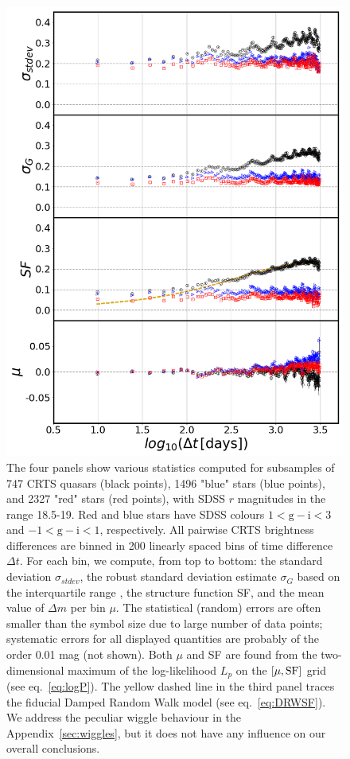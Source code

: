 \documentclass[fleqn,usenatbib]{mnras}
\begin{document}
\begin{figure}
\includegraphics[width=1.05\columnwidth, center]{Fig_2.png}
\vskip -0.15in
\caption{The four panels show various statistics computed for subsamples of 747 CRTS quasars (black points), 
1496 "blue" stars (blue points), and 2327 "red" stars (red points), with SDSS $r$ magnitudes in the range 18.5-19.
 Red and blue stars have SDSS colours $1 < \mathrm{g-i} < 3$ and  $-1 < \mathrm{g-i} < 1$, respectively. All pairwise CRTS brightness 
differences are binned in 200 linearly spaced bins of time difference $\Delta t$. For each bin, we compute,
from top to bottom: the standard deviation $\sigma_{stdev}$, the robust standard deviation estimate $\sigma_{G}$ based on 
the interquartile range , the structure function SF, and the mean value of $\Delta m$ per bin $\mu$. The statistical
(random) errors are often smaller than the symbol size due to large number of data points; systematic errors for
all displayed quantities are probably of the order 0.01 mag (not shown). Both $\mu$ and SF are found from the 
two-dimensional maximum of the log-likelihood $L_{p}$ on the $[\mu,\rm{SF}]$ grid (see eq.~\ref{eq:logP}).  
The yellow dashed line in the third panel traces the fiducial Damped Random Walk model (see eq.~\ref{eq:DRWSF}). We address the peculiar wiggle behaviour in the Appendix~\ref{sec:wiggles}, but it does not have any influence on our overall conclusions. }
\label{fig:2}
\end{figure}
\end{document}
